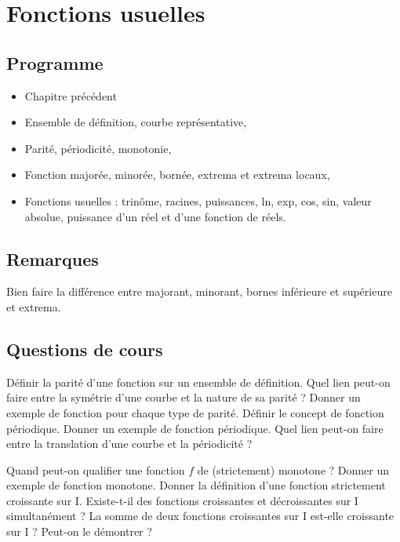  \chapter{Fonctions usuelles}
 
\section{Programme}
	\begin{itemize}
 	\item Chapitre précédent
 	\item Ensemble de définition, courbe représentative,
 	\item Parité, périodicité, monotonie,
 	\item Fonction majorée, minorée, bornée, extrema et extrema locaux,
 	\item Fonctions usuelles : trinôme, racines, puissances, ln, exp, cos, sin, valeur absolue, puissance d'un réel et d'une fonction de réels. 
 \end{itemize}




\section{Remarques}

	\NB Bien faire la différence entre majorant, minorant, bornes inférieure et supérieure et extrema. 
	
	


\section{Questions de cours}	


\begin{exercise}[subtitle=Parité et périodicité, extype=cours]
	\begin{tasks} 
		\task Définir la parité d'une fonction sur un ensemble de définition.
		\task Quel lien peut-on faire entre la symétrie d'une courbe et la nature de sa parité ?
		\task Donner un exemple de fonction pour chaque type de parité.
		\task Définir le concept de fonction périodique. 
		\task Donner un exemple de fonction périodique.
		\task Quel lien peut-on faire entre la translation d'une courbe et la périodicité ?
	\end{tasks}
\end{exercise}

\begin{exercise}[subtitle=Monotonie, extype=cours]
	\begin{tasks} 
		\task Quand peut-on qualifier une fonction $f$ de (strictement) monotone ?
		\task Donner un exemple de fonction monotone.
		\task Donner la définition d'une fonction strictement croissante sur I.
		\task Existe-t-il des fonctions croissantes et décroissantes sur I simultanément ?
		\task La somme de deux fonctions croissantes sur I est-elle croissante sur I ? Peut-on le démontrer ?
	\end{tasks}
\end{exercise}

